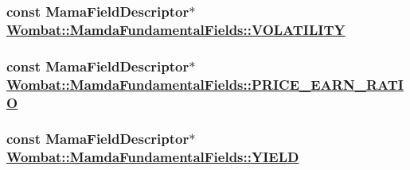 \hypertarget{classWombat_1_1MamdaFundamentalFields_b171dc1932554796b0dd50346f54761f}{
\subsubsection[VOLATILITY]{\setlength{\rightskip}{0pt plus 5cm}const Mama\-Field\-Descriptor$\ast$ \hyperlink{classWombat_1_1MamdaFundamentalFields_b171dc1932554796b0dd50346f54761f}{Wombat::Mamda\-Fundamental\-Fields::VOLATILITY}}}
\label{classWombat_1_1MamdaFundamentalFields_b171dc1932554796b0dd50346f54761f}


\hypertarget{classWombat_1_1MamdaFundamentalFields_2d5fc4043c0dca952abffe3260c366bd}{
\subsubsection[PRICE\_\-EARN\_\-RATIO]{\setlength{\rightskip}{0pt plus 5cm}const Mama\-Field\-Descriptor$\ast$ \hyperlink{classWombat_1_1MamdaFundamentalFields_2d5fc4043c0dca952abffe3260c366bd}{Wombat::Mamda\-Fundamental\-Fields::PRICE\_\-EARN\_\-RATIO}}}
\label{classWombat_1_1MamdaFundamentalFields_2d5fc4043c0dca952abffe3260c366bd}


\hypertarget{classWombat_1_1MamdaFundamentalFields_7d162ed98b3839b425ac54231727d7c4}{
\subsubsection[YIELD]{\setlength{\rightskip}{0pt plus 5cm}const Mama\-Field\-Descriptor$\ast$ \hyperlink{classWombat_1_1MamdaFundamentalFields_7d162ed98b3839b425ac54231727d7c4}{Wombat::Mamda\-Fundamental\-Fields::YIELD}}}
\label{classWombat_1_1MamdaFundamentalFields_7d162ed98b3839b425ac54231727d7c4}


